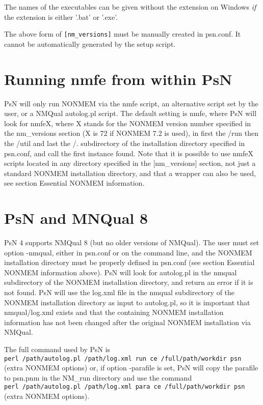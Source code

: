 The names of the executables can be given without the extension on Windows \emph{if} the extension is either '.bat' or '.exe'. 

The above form of \verb|[nm_versions]| must be manually created in psn.conf. It cannot be automatically generated by the setup script.

\section{Running nmfe from within PsN}

PsN will only run NONMEM via the nmfe script, an alternative script set by the user, or a NMQual autolog.pl script. 
The default setting is nmfe, where PsN will look for nmfeX, where X stands for the NONMEM version number specified in the nm\_versions section (X is 72 if NONMEM 7.2 is used), in first the /run then the /util and last the /. subdirectory of the installation directory specified in psn.conf, and call the first instance found. Note that it is possible to use nmfeX scripts located in any directory specified in the [nm\_versions] section, not just a standard NONMEM installation directory, and that a wrapper can also be used, see section Essential NONMEM information.

\section{PsN and MNQual 8}

PsN 4 supports NMQual 8 (but no older versions of NMQual). The user must set option -nmqual, either in psn.conf or on the command line, and the NONMEM installation directory must be properly defined in psn.conf (see section Essential NONMEM information above). PsN will look for autolog.pl in the nmqual subdirectory of the NONMEM installation directory, and return an error if it is not found.
PsN will use the log.xml file in the nmqual subdirectory of the NONMEM installation directory as input to autolog.pl, so it is important that nmqual/log.xml exists and that the containing NONMEM installation information has not been changed after the original NONMEM installation via NMQual.

\noindent The full command used by PsN is\\
\verb|perl /path/autolog.pl /path/log.xml run ce /full/path/workdir psn| (extra NONMEM options)
\noindent or, if option -parafile is set, PsN will copy the parafile to psn.pnm in the NM\_run directory and use the command\\
\verb|perl /path/autolog.pl /path/log.xml para ce /full/path/workdir psn| (extra NONMEM options).

